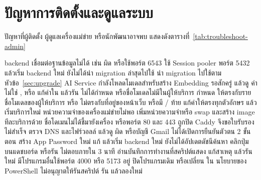 \section{ปัญหาการติดตั้งและดูแลระบบ}

ปัญหาที่ผู้ติดตั้ง ผู้ดูแลเครื่องแม่ข่าย หรือนักพัฒนาอาจพบ แสดงดังตารางที่~\ref{tab:troubleshoot-admin}

\begin{troubleshooting}
        {backend เชื่อมต่อฐานข้อมูลไม่ได้ เช่น  ผิด หรือใช้พอร์ต 6543}
        {ใช้ Session pooler พอร์ต 5432 แล้วเริ่ม backend ใหม่}
        {ยังไม่ได้นำ migration ล่าสุดไปใช้}
        {นำ migration ไปใช้ตามหัวข้อ~\ref{sec:upgrade}}
        {AI Service กำลังโหลดโมเดลสำหรับสร้าง Embedding}
        {รอสักครู่ แล้วดู }
        {ค่า  ไม่ใช่ ,  หรือ }
        {แก้ค่าใน  แล้วรัน }
        {ไม่ได้กำหนด  หรือชื่อโมเดลไม่มีในผู้ให้บริการ}
        {กำหนด  ให้ตรงกับรายชื่อโมเดลของผู้ให้บริการ}
        { หรือ  ไม่ตรงกับที่อยู่ของหน้าเว็บ หรือมี / ท้าย}
        {แก้ค่าให้ตรงทุกตัวอักษร แล้วเริ่มบริการใหม่}
        {หน่วยความจำของเครื่องแม่ข่ายไม่พอ}
        {เพิ่มหน่วยความจำหรือ swap และสร้าง image ทีละบริการด้วย }
        {ชื่อโดเมนไม่ได้ชี้มายังเครื่อง หรือพอร์ต 80 และ 443 ถูกปิด Caddy จึงขอใบรับรองไม่สำเร็จ}
        {ตรวจ DNS และไฟร์วอลล์ แล้วดู }
        { ผิด หรือบัญชี Gmail ไม่ได้เปิดการยืนยันตัวตน 2 ขั้นตอน}
        {สร้าง App Password ใหม่ แก้  แล้วเริ่ม backend ใหม่}
        {ยังไม่ได้อัปเดตดัชนีค้นหา}
        {คลิกปุ่ม  บนแดชบอร์ด หรือรัน }
        { ไม่ตอบภายใน 3 นาที}
        {อ่านบันทึกการทำงานที่สคริปต์แสดง แก้สาเหตุ แล้วรันใหม่}
        {มีโปรแกรมอื่นใช้พอร์ต 4000 หรือ 5173 อยู่}
        {ปิดโปรแกรมเดิม หรือเปลี่ยน  ใน }
        {นโยบายของ PowerShell ไม่อนุญาตให้รันสคริปต์}
        {รัน  แล้วลองใหม่}
\end{troubleshooting}
